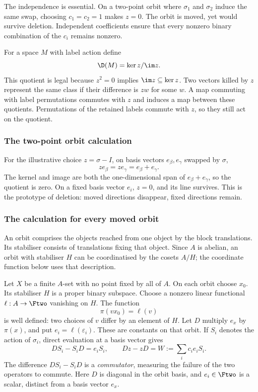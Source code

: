 The independence is essential. On a two-point orbit where $\sigma_1$ and $\sigma_2$ induce the same swap, choosing $c_1=c_2=1$ makes $z=0$. The orbit is moved, yet would survive deletion. Independent coefficients ensure that every nonzero binary combination of the $c_i$ remains nonzero.

For a space $M$ with label action define
\begin{equation}\label{eq:D2}\D(M)=\ker z/\im z.\end{equation}
This quotient is legal because $z^2=0$ implies $\im z\subseteq\ker z$. Two vectors killed by $z$ represent the same class if their difference is $zw$ for some $w$. A map commuting with label permutations commutes with $z$ and induces a map between these quotients. Permutations of the retained labels commute with $z$, so they still act on the quotient.

\subsubsection{The two-point orbit calculation}
For the illustrative choice $z=\sigma-I$, on basis vectors $e_\beta,e_\gamma$ swapped by $\sigma$,
\[ze_\beta=ze_\gamma=e_\beta+e_\gamma.\]
The kernel and image are both the one-dimensional span of $e_\beta+e_\gamma$, so the quotient is zero. On a fixed basis vector $e_i$, $z=0$, and its line survives. This is the prototype of deletion: moved directions disappear, fixed directions remain.

\subsubsection{The calculation for every moved orbit}
An orbit comprises the objects reached from one object by the block
translations. Its stabiliser consists of translations fixing that
object. Since $A$ is abelian, an orbit with stabiliser $H$ can be
coordinatised by the cosets $A/H$; the coordinate function below uses
that description.

Let $X$ be a finite $A$-set with no point fixed by all of $A$. On each orbit choose $x_0$. Its stabiliser $H$ is a proper binary subspace. Choose a nonzero linear functional $\ell:A\to\Ftwo$ vanishing on $H$. The function
\[\pi(vx_0)=\ell(v)\]
is well defined: two choices of $v$ differ by an element of $H$. Let $D$ multiply $e_x$ by $\pi(x)$, and put $e_i=\ell(\varepsilon_i)$. These are constants on that orbit. If $S_i$ denotes the action of $\sigma_i$, direct evaluation at a basis vector gives
\[DS_i-S_iD=e_iS_i,\qquad Dz-zD=W:=\sum_i c_ie_iS_i.\]
The difference $DS_i-S_iD$ is a \emph{commutator}, measuring the
failure of the two operators to commute. Here $D$ is diagonal in the
orbit basis, and $e_i\in\Ftwo$ is a scalar, distinct from a basis
vector $e_x$.

